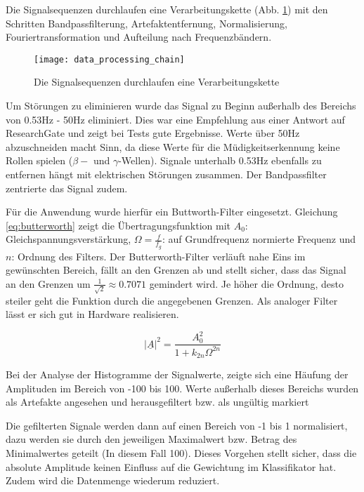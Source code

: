 \label{sec:processing}
Die Signalsequenzen durchlaufen eine Verarbeitungskette (Abb. \ref{fig:data_processing_chain}) mit den Schritten Bandpassfilterung, Artefaktentfernung, Normalisierung, Fouriertransformation und Aufteilung nach Frequenzbändern.

\begin{figure}[h] 
  \begin{center}
    \texttt{[image: data\_processing\_chain]}
    \caption[Verarbeitungskette]{Die Signalsequenzen durchlaufen eine Verarbeitungskette \label{fig:data_processing_chain}}
  \end{center}
\end{figure}

Um Störungen zu eliminieren wurde das Signal zu Beginn außerhalb des Bereichs von 0.53Hz - 50Hz eliminiert. Dies war eine Empfehlung aus einer Antwort auf ResearchGate \cite{resGate} und zeigt bei Tests gute Ergebnisse. Werte über 50Hz abzuschneiden macht Sinn, da diese Werte für die Müdigkeitserkennung keine Rollen spielen ($\beta-$ und $\gamma$-Wellen). Signale unterhalb 0.53Hz ebenfalls zu entfernen hängt mit elektrischen Störungen zusammen. Der Bandpassfilter zentrierte das Signal zudem. 

Für die Anwendung wurde hierfür ein Buttworth-Filter\cite{Butterworth30} eingesetzt. Gleichung \ref{eq:butterworth} zeigt die Übertragungsfunktion mit $A_0$: Gleichspannungsverstärkung, $\Omega = \frac{f}{f_g}$: auf Grundfrequenz normierte Frequenz und $n$: Ordnung des Filters.  Der Butterworth-Filter verläuft nahe Eins im gewünschten Bereich, fällt an den Grenzen ab und stellt sicher, dass das Signal an den Grenzen um $\frac{1}{\sqrt{2}} \approx 0.7071$ gemindert wird. Je höher die Ordnung, desto steiler geht die Funktion durch die angegebenen Grenzen. Als analoger Filter lässt er sich gut in Hardware realisieren.

\begin{equation} \label{eq:butterworth}
\left|\underline{A}\right|^2 = \frac{A_0^2}{1+ k_{2n} \Omega ^{2n}}
\end{equation}

Bei der Analyse der Histogramme der Signalwerte, zeigte sich eine Häufung der Amplituden im Bereich von -100 bis 100. Werte außerhalb dieses Bereichs wurden als Artefakte angesehen und herausgefiltert bzw. als ungültig markiert\rawHisto

Die gefilterten Signale werden dann auf einen Bereich von -1 bis 1 normalisiert, dazu werden sie durch den jeweiligen Maximalwert bzw. Betrag des Minimalwertes geteilt (In diesem Fall 100). Dieses Vorgehen stellt sicher, dass die absolute Amplitude keinen Einfluss auf die Gewichtung im Klassifikator hat. Zudem wird die Datenmenge wiederum reduziert. 

